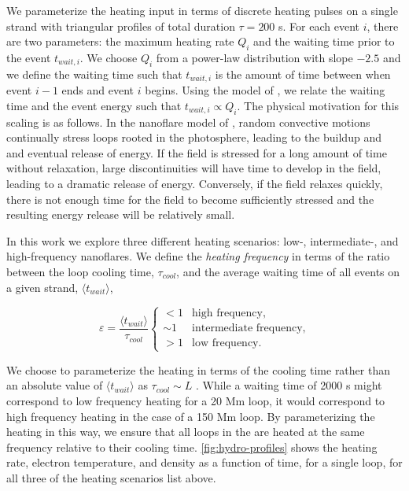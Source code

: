 We parameterize the heating input in terms of discrete heating pulses on a single strand with triangular profiles of total duration $\tau=200$ s. For each event $i$, there are two parameters: the maximum heating rate $Q_i$ and the waiting time prior to the event $t_{wait,i}$. We choose $Q_i$ from a power-law distribution with slope $-2.5$ and we define the waiting time such that $t_{wait,i}$ is the amount of time between when event $i-1$ ends and event $i$ begins. Using the model of \citet{cargill_active_2014}, we relate the waiting time and the event energy such that $t_{wait,i}\propto Q_i$. The physical motivation for this scaling is as follows. In the nanoflare model of \citet{parker_nanoflares_1988}, random convective motions continually stress loops rooted in the photosphere, leading to the buildup and and eventual release of energy. If the field is stressed for a long amount of time without relaxation, large discontinuities will have time to develop in the field, leading to a dramatic release of energy. Conversely, if the field relaxes quickly, there is not enough time for the field to become sufficiently stressed and the resulting energy release will be relatively small. 

In this work we explore three different heating scenarios: low-, intermediate-, and high-frequency nanoflares. We define the \textit{heating frequency} in terms of the ratio between the loop cooling time, $\tau_{cool}$, and the average waiting time of all events on a given strand, $\langle t_{wait}\rangle$,

\begin{equation}\label{eq:heating_types}
    \varepsilon = \frac{\langle t_{wait}\rangle}{\tau_{cool}}
    \begin{cases} 
        < 1 &  \text{high frequency},\\
        \sim1 & \text{intermediate frequency}, \\
        > 1 & \text{low frequency}.
     \end{cases}
\end{equation}

We choose to parameterize the heating in terms of the cooling time rather than an absolute value of $\langle t_{wait}\rangle$ as $\tau_{cool}\sim L$ \citep[see appendix]{cargill_active_2014}. While a waiting time of 2000 s might correspond to low frequency heating for a 20 Mm loop, it would correspond to high frequency heating in the case of a 150 Mm loop. By parameterizing the heating in this way, we ensure that all loops in the \AR{} are heated at the same frequency relative to their cooling time. \autoref{fig:hydro-profiles} shows the heating rate, electron temperature, and density as a function of time, for a single loop, for all three of the heating scenarios list above. 

